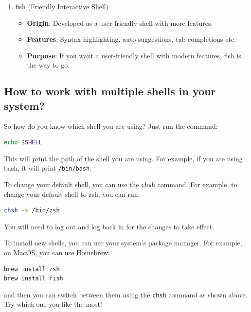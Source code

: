\begin{enumerate}
\begin{itemize}
    \end{itemize}
    \item fish (Friendly Interactive Shell)
    \begin{itemize}
        \item \textbf{Origin}: Developed as a user-friendly shell with more features.
        \item \textbf{Features}: Syntax highlighting, auto-suggestions, tab completions etc.
        \item \textbf{Purpose}: If you want a user-friendly shell with modern features, fish is the way to go.
    \end{itemize}
\end{enumerate}

\subsection{How to work with multiple shells in your system?}
So how do you know which shell you are using? Just run the command:
\begin{lstlisting}[language=bash]
echo $SHELL
\end{lstlisting}
This will print the path of the shell you are using. For example, if you are using bash, it will print \texttt{/bin/bash}.

To change your default shell, you can use the \texttt{chsh} command. For example, to change your default shell to zsh, you can run:
\begin{lstlisting}[language=bash]
chsh -s /bin/zsh
\end{lstlisting}
You will need to log out and log back in for the changes to take effect.

To install new shells, you can use your system's package manager. For example, on MacOS, you can use Homebrew:
\begin{lstlisting}[language=bash]
brew install zsh
brew install fish
\end{lstlisting}
and then you can switch between them using the \texttt{chsh} command as shown above. Try which one you like the most!